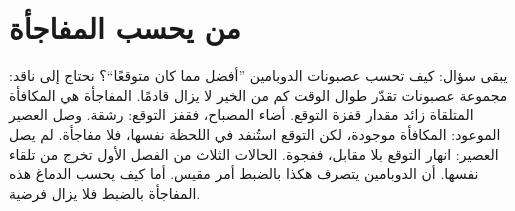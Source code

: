 \section*{من يحسب المفاجأة}

يبقى سؤال: كيف تحسب عصبونات الدوبامين ”أفضل مما كان متوقعًا“؟ نحتاج إلى ناقد: مجموعة عصبونات تقدّر طوال الوقت كم من الخير لا يزال قادمًا. المفاجأة هي المكافأة المتلقاة زائد مقدار قفزة التوقع. أضاء المصباح، فقفز التوقع: رشقة. وصل العصير الموعود: المكافأة موجودة، لكن التوقع استُنفد في اللحظة نفسها، فلا مفاجأة. لم يصل العصير: انهار التوقع بلا مقابل، ففجوة. الحالات الثلاث من الفصل الأول تخرج من تلقاء نفسها. أن الدوبامين يتصرف هكذا بالضبط أمر مقيس. أما كيف يحسب الدماغ هذه المفاجأة بالضبط فلا يزال فرضية.

